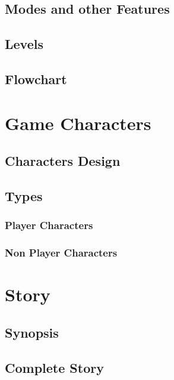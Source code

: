 \documentclass[12pt]{article}
\begin{document}
\subsection{Modes and other Features}

\subsection{Levels}

\subsection{Flowchart}

\newpage

\section{Game Characters}

\subsection{Characters Design}

\subsection{Types}

\subsubsection{Player Characters}

\subsubsection{Non Player Characters}

\newpage

\section{Story}

\subsection{Synopsis}

\subsection{Complete Story}
\end{document}
